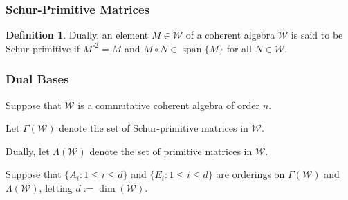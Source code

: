 \documentclass[notheorems]{beamer}
\theoremstyle{definition} %
\newtheorem{definition}{Definition}[section] %
\begin{document}
\begin{frame}

\frametitle{Schur-Primitive Matrices}

	\begin{definition}
		Dually, an element $M \in \mathcal{W}$ of a coherent algebra $\mathcal{W}$ is said to be Schur-primitive if $M^{\circ 2} = M$ and $M \circ N \in \operatorname{span} \{ M \}$ for all $N \in \mathcal{W}$.
	\end{definition}

\end{frame}

\begin{frame}

\frametitle{Dual Bases}



	\vspace{1em}


\end{frame}

\begin{frame}



	Suppose that $\mathcal{W}$ is a commutative coherent algebra of order $n$.

	\vspace{1em}

	Let $\Gamma(\mathcal{W})$ denote the set of Schur-primitive matrices in $\mathcal{W}$.

	\vspace{1em}

	Dually, let $\Lambda(\mathcal{W})$ denote the set of primitive matrices in $\mathcal{W}$.

	\vspace{1em}

	Suppose that $\{ A_{i} : 1 \leq i \leq d \}$ and $\{ E_{i} : 1 \leq i \leq d \}$ are orderings 
	on $\Gamma(\mathcal{W})$ and $\Lambda(\mathcal{W})$, letting $d := \operatorname{dim}(\mathcal{W})$.

\end{frame}
\end{document}
